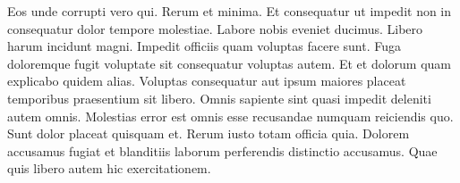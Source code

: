 Eos unde corrupti vero qui. Rerum et minima. Et consequatur ut impedit non in consequatur dolor tempore molestiae. Labore nobis eveniet ducimus.
Libero harum incidunt magni. Impedit officiis quam voluptas facere sunt. Fuga doloremque fugit voluptate sit consequatur voluptas autem. Et et dolorum quam explicabo quidem alias. Voluptas consequatur aut ipsum maiores placeat temporibus praesentium sit libero. Omnis sapiente sint quasi impedit deleniti autem omnis.
Molestias error est omnis esse recusandae numquam reiciendis quo. Sunt dolor placeat quisquam et. Rerum iusto totam officia quia. Dolorem accusamus fugiat et blanditiis laborum perferendis distinctio accusamus. Quae quis libero autem hic exercitationem.
